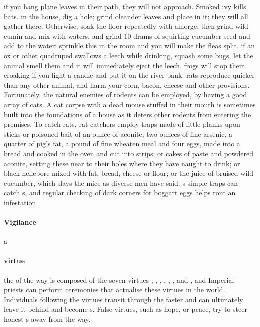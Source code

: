\localpar {} if you hang plane leaves in their path, they will not approach. Smoked ivy kills bats. \localpar {} in the house, dig a hole; grind oleander leaves and place in it; they will all gather there. Otherwise, soak the floor repeatedly with amorge; then grind wild cumin and mix with waters, and grind 10 drams of squirting cucumber seed and add to the water; sprinkle this in the room and you will make the fleas split. \localpar {} if an ox or other quadruped swallows a leech while drinking, squash some bugs, let the animal smell them and it will immediately eject the leech. \localpar {} frogs will stop their croaking if you light a candle and put it on the river-bank. \localpar {} rats reproduce quicker than any other animal, and harm your corn, bacon, cheese and other provisions. Fortunately, the natural enemies of rodents can be employed, by having a good array of cats. A cat corpse with a dead mouse stuffed in their mouth is sometimes built into the foundations of a house as it deters other rodents from entering the premises. To catch rats, rat-catchers employ traps made of little planks upon sticks or poisoned bait of an ounce of aconite, two ounces of fine arsenic, a quarter of pig's fat, a pound of fine wheaten meal and four eggs, made into a bread and cooked in the oven and cut into strips; or cakes of paste and powdered aconite, setting these near to their holes where they have naught to drink; or black hellebore mixed with fat, bread, cheese or flour; or the juice of bruised wild cucumber, which slays the mice as diverse men have said. \localpar {}s simple traps can catch s, and regular checking of dark corners for boggart eggs helps rout an infestation. \bigparagraphendtwiddle
\paragraph{Vigilance} a  
\paragraph{virtue} the  of the way is composed of the seven virtues , , , , , , and , and Imperial priests can perform ceremonies that actualise these virtues in the world. Individuals following the virtues transit through the  faster and can ultimately leave it behind and become s. False virtues, such as hope,  or peace, try to steer honest s away from the way. 
